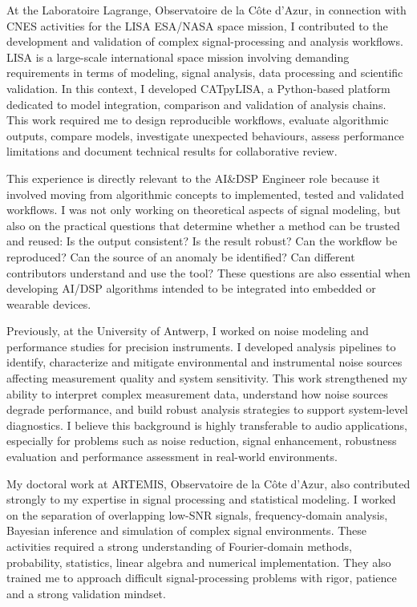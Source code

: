 \documentclass[11pt,a4paper]{altacv}
\begin{document}
{At the Laboratoire Lagrange, Observatoire de la Côte d'Azur, in connection with CNES activities for the LISA ESA/NASA space mission, I contributed to the development and validation of complex signal-processing and analysis workflows. LISA is a large-scale international space mission involving demanding requirements in terms of modeling, signal analysis, data processing and scientific validation. In this context, I developed CATpyLISA, a Python-based platform dedicated to model integration, comparison and validation of analysis chains. This work required me to design reproducible workflows, evaluate algorithmic outputs, compare models, investigate unexpected behaviours, assess performance limitations and document technical results for collaborative review.

This experience is directly relevant to the AI\&DSP Engineer role because it involved moving from algorithmic concepts to implemented, tested and validated workflows. I was not only working on theoretical aspects of signal modeling, but also on the practical questions that determine whether a method can be trusted and reused: Is the output consistent? Is the result robust? Can the workflow be reproduced? Can the source of an anomaly be identified? Can different contributors understand and use the tool? These questions are also essential when developing AI/DSP algorithms intended to be integrated into embedded or wearable devices.

Previously, at the University of Antwerp, I worked on noise modeling and performance studies for precision instruments. I developed analysis pipelines to identify, characterize and mitigate environmental and instrumental noise sources affecting measurement quality and system sensitivity. This work strengthened my ability to interpret complex measurement data, understand how noise sources degrade performance, and build robust analysis strategies to support system-level diagnostics. I believe this background is highly transferable to audio applications, especially for problems such as noise reduction, signal enhancement, robustness evaluation and performance assessment in real-world environments.

My doctoral work at ARTEMIS, Observatoire de la Côte d'Azur, also contributed strongly to my expertise in signal processing and statistical modeling. I worked on the separation of overlapping low-SNR signals, frequency-domain analysis, Bayesian inference and simulation of complex signal environments. These activities required a strong understanding of Fourier-domain methods, probability, statistics, linear algebra and numerical implementation. They also trained me to approach difficult signal-processing problems with rigor, patience and a strong validation mindset.

}
\end{document}
